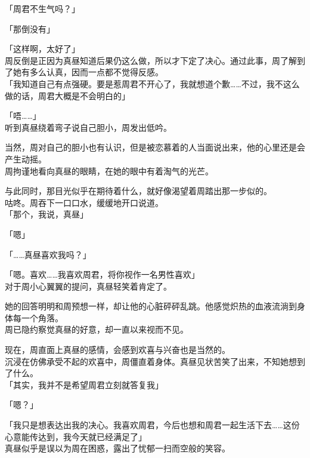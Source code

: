 「周君不生气吗？」

「那倒没有」

「这样啊，太好了」\\

周反倒是正因为真昼知道后果仍这么做，所以才下定了决心。通过此事，周了解到了她有多么认真，因而一点都不觉得反感。\\

「我知道自己有点强硬。要是惹周君不开心了，我就想道个歉……不过，我不这么做的话，周君大概是不会明白的」

「唔……」\\

听到真昼绕着弯子说自己胆小，周发出低吟。

当然，周对自己的胆小也有认识，但是被恋慕着的人当面说出来，他的心里还是会产生动摇。\\

周拘谨地看向真昼的眼睛，在她的眼中有着淘气的光芒。

与此同时，那目光似乎在期待着什么，就好像渴望着周踏出那一步似的。\\

咕咚。周吞下一口口水，缓缓地开口说道。\\

「那个，我说，真昼」

「嗯」

「……真昼喜欢我吗？」

「嗯。喜欢……我喜欢周君，将你视作一名男性喜欢」\\

对于周小心翼翼的提问，真昼轻笑着肯定了。

她的回答明明和周预想一样，却让他的心脏砰砰乱跳。他感觉炽热的血液流淌到身体每一个角落。\\

周已隐约察觉真昼的好意，却一直以来视而不见。

现在，周直面上真昼的感情，会感到欢喜与兴奋也是当然的。\\

沉浸在仿佛承受不起的欢喜中，周僵直着身体。真昼见状苦笑了出来，不知她想到了什么。\\

「其实，我并不是希望周君立刻就答复我」

「嗯？」

「我只是想表达出我的决心。我喜欢周君，今后也想和周君一起生活下去……这份心意能传达到，我今天就已经满足了」\\

真昼似乎是误以为周在困惑，露出了忧郁一扫而空般的笑容。\\

